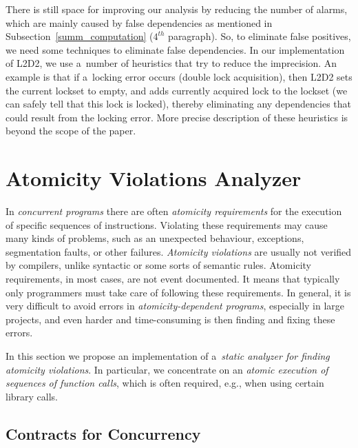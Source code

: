 \documentclass{ExcelAtFIT}
\begin{document}
There is still space for improving our analysis by reducing the number of alarms, which are mainly caused by false dependencies as mentioned in Subsection~\ref{summ_computation} ($4^{th}$ paragraph). So, to eliminate false positives, we need some techniques to eliminate false dependencies. In our implementation of L2D2, we use a~number of heuristics that try to reduce the imprecision. An example is that if a~locking error occurs (double lock acquisition), then L2D2 sets the current lockset to empty, and adds currently acquired lock to the lockset (we can safely tell that this lock is locked), thereby eliminating any dependencies that could result from the locking error. More precise description of these heuristics is beyond the scope of the paper.

\section{Atomicity Violations Analyzer}

In \emph{concurrent programs} there are often
\emph{atomicity requirements} for the execution of specific
sequences of instructions. Violating these requirements
may cause many kinds of problems, such as an unexpected
behaviour, exceptions, segmentation faults, or other
failures. \emph{Atomicity violations} are usually not
verified by compilers, unlike syntactic or some sorts
of semantic rules. Atomicity requirements,
in most cases, are not event documented. It means
that typically only programmers must take care of
following these requirements. In general, it is very
difficult to avoid errors in \emph{atomicity-dependent
programs}, especially in large projects, and even harder
and time-consuming is then finding and fixing these errors.

In this section we propose
an implementation of a~\emph{static analyzer for
finding atomicity violations}. In particular,
we concentrate on an \emph{atomic execution 
of sequences of function calls}, which is often 
required, e.g., when using certain library calls.

\subsection{Contracts for Concurrency}
\label{sec:contracts}
\end{document}
